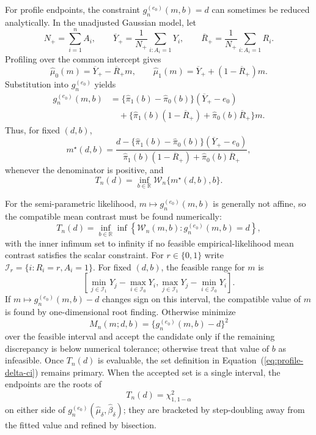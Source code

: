 \documentclass[11pt]{article}
\begin{document}
For profile endpoints, the constraint $g_n^{(e_0)}(m,b)=d$ can sometimes be reduced analytically. In the unadjusted Gaussian model, let
\[
  N_+=\sum_{i=1}^n A_i,
  \qquad
  \overline{Y}_+
  =
  \frac{1}{N_+}\sum_{i:A_i=1}Y_i,
  \qquad
  \overline{R}_+
  =
  \frac{1}{N_+}\sum_{i:A_i=1}R_i.
\]
Profiling over the common intercept gives
\[
  \widehat{\mu}_0(m)=\overline{Y}_+-\overline{R}_+m,
  \qquad
  \widehat{\mu}_1(m)=\overline{Y}_++(1-\overline{R}_+)m.
\]
Substitution into $g_n^{(e_0)}$ yields
\begin{align*}
  g_n^{(e_0)}(m,b)
  &=
  \{\widehat{\pi}_1(b)-\widehat{\pi}_0(b)\}
  (\overline{Y}_+-e_0)\\
  &\quad+
  \{\widehat{\pi}_1(b)(1-\overline{R}_+)
    +\widehat{\pi}_0(b)\overline{R}_+\}m.
\end{align*}
Thus, for fixed $(d,b)$,
\[
  m^\star(d,b)
  =
  \frac{
    d-\{\widehat{\pi}_1(b)-\widehat{\pi}_0(b)\}
    (\overline{Y}_+-e_0)
  }{
    \widehat{\pi}_1(b)(1-\overline{R}_+)
    +\widehat{\pi}_0(b)\overline{R}_+
  },
\]
whenever the denominator is positive, and
\[
  T_n(d)
  =
  \inf_{b\in\mathbb{R}}
  \mathcal{W}_n\{m^\star(d,b),b\}.
\]

For the semi-parametric likelihood, $m\mapsto g_n^{(e_0)}(m,b)$ is generally not affine, so the compatible mean contrast must be found numerically:
\[
  T_n(d)
  =
  \inf_{b\in\mathbb{R}}
  \inf\left\{
    \mathcal{W}_n(m,b):
    g_n^{(e_0)}(m,b)=d
  \right\},
\]
with the inner infimum set to infinity if no feasible empirical-likelihood mean contrast satisfies the scalar constraint. For $r\in\{0,1\}$ write $\mathcal{I}_r=\{i:R_i=r,A_i=1\}$. For fixed $(d,b)$, the feasible range for $m$ is
\[
  \left[
    \min_{j\in\mathcal{I}_1}Y_j-
    \max_{i\in\mathcal{I}_0}Y_i,
    \max_{j\in\mathcal{I}_1}Y_j-
    \min_{i\in\mathcal{I}_0}Y_i
  \right].
\]
If $m\mapsto g_n^{(e_0)}(m,b)-d$ changes sign on this interval, the compatible value of $m$ is found by one-dimensional root finding. Otherwise minimize
\[
  M_n(m;d,b)=\{g_n^{(e_0)}(m,b)-d\}^2
\]
over the feasible interval and accept the candidate only if the remaining discrepancy is below numerical tolerance; otherwise treat that value of $b$ as infeasible. Once $T_n(d)$ is evaluable, the set definition in Equation~(\ref{eq:profile-delta-ci}) remains primary. When the accepted set is a single interval, the endpoints are the roots of
\[
  T_n(d)=\chi^2_{1,1-\alpha}
\]
on either side of $g_n^{(e_0)}(\widehat{\mu}_\delta,\widehat{\beta}_\delta)$; they are bracketed by step-doubling away from the fitted value and refined by bisection.
\end{document}
